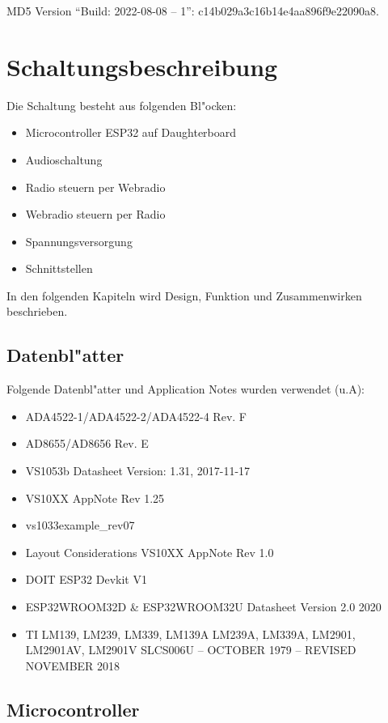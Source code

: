\documentclass[ngerman,11pt,parskip=half] {scrartcl}
\begin{document}
MD5 Version "`Build: 2022-08-08 -- 1"': c14b029a3c16b14e4aa896f9e22090a8.

\section{Schaltungsbeschreibung} \label{sec:schaltung}

Die Schaltung besteht aus folgenden Bl"ocken:
\begin{itemize}
\item Microcontroller ESP32 auf Daughterboard
\item Audioschaltung
\item Radio steuern per Webradio
\item Webradio steuern per Radio
\item Spannungsversorgung
\item Schnittstellen
\end{itemize}

In den folgenden Kapiteln wird Design, Funktion und Zusammenwirken beschrieben.

\subsection{Datenbl"atter} \label{sec:schaltung:datenblaetter}

Folgende Datenbl"atter und Application Notes wurden verwendet (u.A):
\begin{itemize}
\item ADA4522-1/ADA4522-2/ADA4522-4 Rev. F
\item AD8655/AD8656 Rev. E
\item VS1053b Datasheet Version: 1.31, 2017-11-17
\item VS10XX AppNote Rev 1.25
\item vs1033example\_rev07
\item Layout Considerations VS10XX AppNote Rev 1.0
\item DOIT ESP32 Devkit V1
\item ESP32­WROOM­32D \& ESP32­WROOM­32U Datasheet Version 2.0 2020
\item TI LM139, LM239, LM339, LM139A LM239A, LM339A, LM2901, LM2901AV, LM2901V  SLCS006U – OCTOBER 1979 – REVISED NOVEMBER 2018
\end{itemize}

\subsection{Microcontroller} \label{sec:schaltung:Microcontroller}
\end{document}
